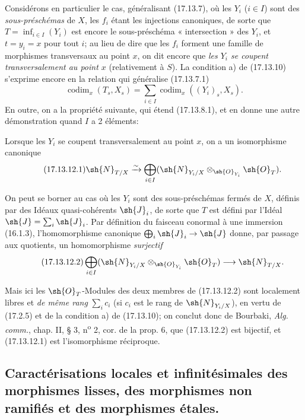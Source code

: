 \begin{env}[17.13.11]
\label{IV.17.13.11}
Considérons en particulier le cas, généralisant (17.13.7), où les $Y_i$ ($i\in I$) sont des \emph{sous-préschémas} de $X$, les $f_i$ étant les injections canoniques, de sorte que $T=\inf_{i\in I}(Y_i)$ est encore le sous-préschéma « intersection » des $Y_i$, et $t=y_i=x$ pour tout $i$; au lieu de dire que les $f_i$ forment une famille de morphismes transversaux au point $x$, on dit encore que \emph{les $Y_i$ se coupent transversalement au point $x$} (relativement à $S$). La condition a) de (17.13.10) s'exprime encore en la relation qui généralise (17.13.7.1)
\[
\label{IV.17.13.11.1}
\tag{17.13.11.1}
\operatorname{codim}_x(T_s,X_s)=\sum_{i\in I}\operatorname{codim}_x((Y_i)_s,X_s).
\]
En outre, on a la propriété suivante, qui étend (17.13.8.1), et en donne une autre démonstration quand $I$ a 2 éléments:
\end{env}

\begin{corollary}[17.13.12]
\label{IV.17.13.12}
Lorsque les $Y_i$ se coupent transversalement au point $x$, on a un isomorphisme canonique
\[
\label{IV.17.13.12.1}
\tag{17.13.12.1}
\sh{N}_{T/X}\xrightarrow{\sim}\bigoplus_{i\in I}(\sh{N}_{Y_i/X}\otimes_{\sh{O}_{Y_i}}\sh{O}_T).
\]
\end{corollary}

On peut se borner au cas où les $Y_i$ sont des sous-préschémas fermés de $X$, définis par des Idéaux quasi-cohérents $\sh{J}_i$, de sorte que $T$ est défini par l'Idéal $\sh{J}=\sum_i\sh{J}_i$. Par définition du faisceau conormal à une immersion (16.1.3), l'homomorphisme canonique $\bigoplus_i\sh{J}_i\to\sh{J}$ donne, par passage aux quotients, un homomorphisme \emph{surjectif}
\[
\label{IV.17.13.12.2}
\tag{17.13.12.2}
\bigoplus_{i\in I}(\sh{N}_{Y_i/X}\otimes_{\sh{O}_{Y_i}}\sh{O}_T)\to\sh{N}_{T/X}.
\]


Mais ici les $\sh{O}_T$-Modules des deux membres de (17.13.12.2) sont localement libres et \emph{de même rang} $\sum_i c_i$ (si $c_i$ est le rang de $\sh{N}_{Y_i/X}$), en vertu de (17.2.5) et de la condition a) de (17.13.10); on conclut donc de Bourbaki, \emph{Alg. comm.}, chap. II, § 3, n\textsuperscript{o} 2, cor. de la prop. 6, que (17.13.12.2) est bijectif, et (17.13.12.1) est l'isomorphisme réciproque.

\subsection{Caractérisations locales et infinitésimales des morphismes lisses, des morphismes non ramifiés et des morphismes étales.}
\label{subsection:IV.17.14}

